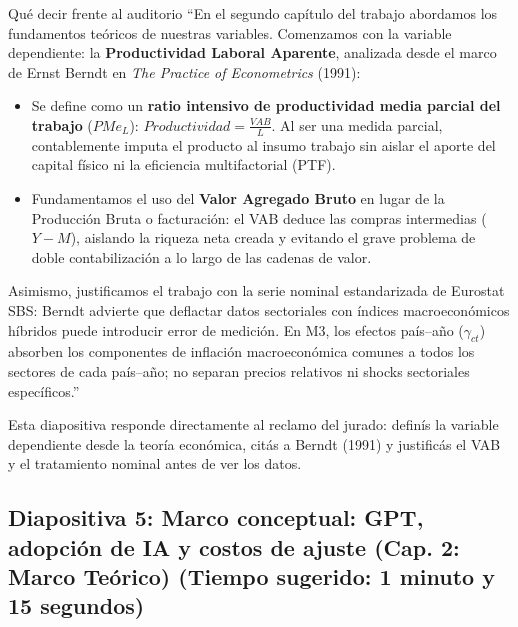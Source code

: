 \documentclass[11pt,a4paper]{article}
\begin{document}
\begin{speechbox}{Qué decir frente al auditorio}
``En el segundo capítulo del trabajo abordamos los fundamentos teóricos de nuestras variables. Comenzamos con la variable dependiente: la \textbf{Productividad Laboral Aparente}, analizada desde el marco de Ernst Berndt en \textit{The Practice of Econometrics} (1991):

\begin{itemize}[itemsep=0.15em]
  \item Se define como un \textbf{ratio intensivo de productividad media parcial del trabajo} ($PMe_L$): $Productividad = \frac{VAB}{L}$. Al ser una medida parcial, contablemente imputa el producto al insumo trabajo sin aislar el aporte del capital físico ni la eficiencia multifactorial (PTF).
  \item Fundamentamos el uso del \textbf{Valor Agregado Bruto} en lugar de la Producción Bruta o facturación: el VAB deduce las compras intermedias ($Y - M$), aislando la riqueza neta creada y evitando el grave problema de doble contabilización a lo largo de las cadenas de valor.
\end{itemize}

Asimismo, justificamos el trabajo con la serie nominal estandarizada de Eurostat SBS: Berndt advierte que deflactar datos sectoriales con índices macroeconómicos híbridos puede introducir error de medición. En M3, los efectos país--año ($\gamma_{ct}$) absorben los componentes de inflación macroeconómica comunes a todos los sectores de cada país--año; no separan precios relativos ni shocks sectoriales específicos.''
\end{speechbox}

\begin{tipbox}
Esta diapositiva responde directamente al reclamo del jurado: definís la variable dependiente desde la teoría económica, citás a Berndt (1991) y justificás el VAB y el tratamiento nominal antes de ver los datos.
\end{tipbox}

\subsection*{Diapositiva 5: Marco conceptual: GPT, adopción de IA y costos de ajuste (Cap. 2: Marco Teórico) (Tiempo sugerido: 1 minuto y 15 segundos)}
\end{document}
